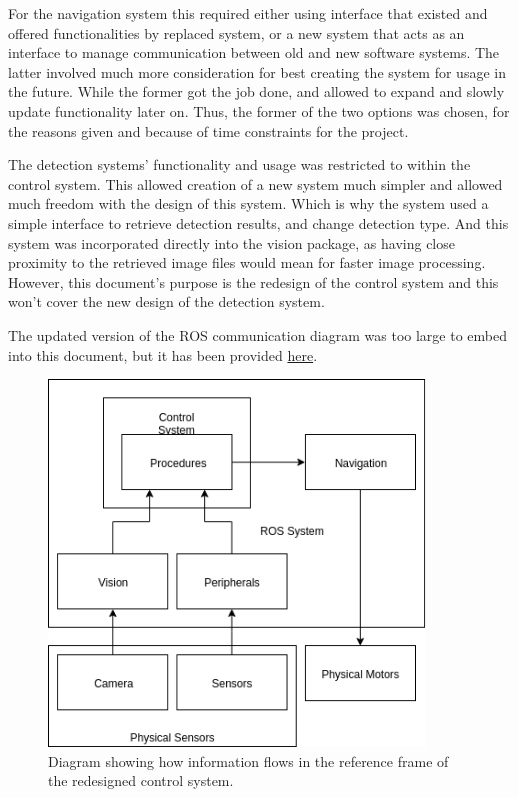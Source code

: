 For the navigation system this required either using interface that existed and
offered functionalities by replaced system, or a new system that acts as an
interface to manage communication between old and new software systems.
The latter involved much more consideration for best creating the system for
usage in the future.
While the former got the job done, and allowed to expand and slowly update
functionality later on.
Thus, the former of the two options was chosen, for the reasons given and
because of time constraints for the project.

The detection systems' functionality and usage was restricted to within the
control system.
This allowed creation of a new system much simpler and allowed much freedom with
the design of this system.
Which is why the system used a simple interface to retrieve detection results,
and change detection type.
And this system was incorporated directly into the vision package, as having
close proximity to the retrieved image files would mean for faster image
processing.
However, this document's purpose is the redesign of the control system and this
won't cover the new design of the detection system.

The updated version of the ROS communication diagram was too large to embed into
this document, but it has been provided \href{https://drive.google.com/file/d/1_vJLSflxahA-7v2kYGV3wu5SfGcKEVf8/view?usp=sharing}{here}.

\begin{figure}[H]
\centering
\includegraphics[width=100mm]{Figures/InformationFlowNew}
\decoRule
\caption[New Information Flow]{Diagram showing how information flows in the reference frame of the redesigned control system.}
\label{fig:InformationFlowNew}
\end{figure}

